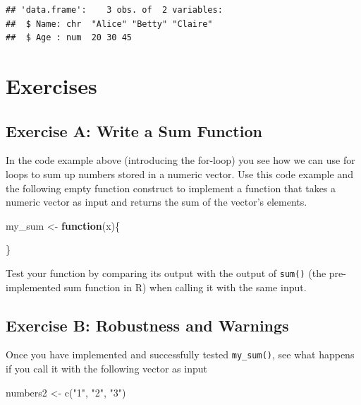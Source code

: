 \documentclass[
  12pt,
]{style/krantz}
\newenvironment{Shaded}{\begin{snugshade}}{\end{snugshade}}
\newcommand{\ControlFlowTok}[1]{\textcolor[rgb]{0.13,0.29,0.53}{\textbf{#1}}}
\newcommand{\FunctionTok}[1]{\textcolor[rgb]{0.00,0.00,0.00}{#1}}
\newcommand{\NormalTok}[1]{#1}
\newcommand{\OtherTok}[1]{\textcolor[rgb]{0.56,0.35,0.01}{#1}}
\newcommand{\StringTok}[1]{\textcolor[rgb]{0.31,0.60,0.02}{#1}}
\begin{document}
\begin{verbatim}
## 'data.frame':    3 obs. of  2 variables:
##  $ Name: chr  "Alice" "Betty" "Claire"
##  $ Age : num  20 30 45
\end{verbatim}

\hypertarget{exercises-1}{%
\section{Exercises}\label{exercises-1}}

\hypertarget{exercise-a-write-a-sum-function}{%
\subsection{Exercise A: Write a Sum Function}\label{exercise-a-write-a-sum-function}}

In the code example above (introducing the for-loop) you see how we can use for loops to sum up numbers stored in a numeric vector. Use this code example and the following empty function construct to implement a function that takes a numeric vector as input and returns the sum of the vector's elements.

\begin{Shaded}
\begin{Highlighting}[]
\NormalTok{my\_sum }\OtherTok{\textless{}{-}} 
     \ControlFlowTok{function}\NormalTok{(x)\{}
          
\NormalTok{     \}}
\end{Highlighting}
\end{Shaded}

Test your function by comparing its output with the output of \texttt{sum()} (the pre-implemented sum function in R) when calling it with the same input.

\hypertarget{exercise-b-robustness-and-warnings}{%
\subsection{Exercise B: Robustness and Warnings}\label{exercise-b-robustness-and-warnings}}

Once you have implemented and successfully tested \texttt{my\_sum()}, see what happens if you call it with the following vector as input

\begin{Shaded}
\begin{Highlighting}[]
\NormalTok{numbers2 }\OtherTok{\textless{}{-}} \FunctionTok{c}\NormalTok{(}\StringTok{"1"}\NormalTok{, }\StringTok{"2"}\NormalTok{, }\StringTok{"3"}\NormalTok{)}
\end{Highlighting}
\end{Shaded}
\end{document}

